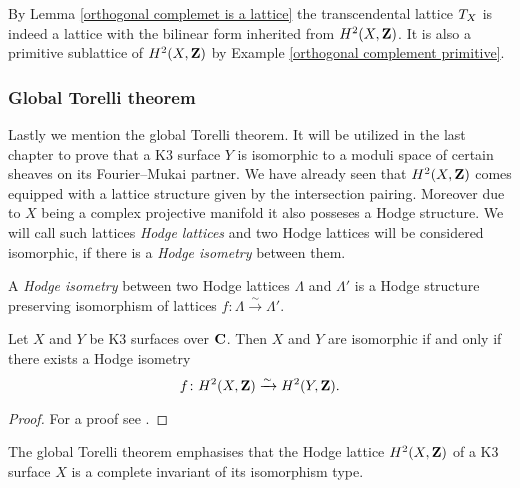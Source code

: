 \begin{remark}
    By Lemma \ref{orthogonal complemet is a lattice} the transcendental lattice $T_{X}$ is indeed a lattice with the bilinear form inherited from $H^{2}(X, \mathbf Z)$. It is also a primitive sublattice of $H^{2}(X, \mathbf Z)$ by Example \ref{orthogonal complement primitive}.
\end{remark}

\subsubsection*{Global Torelli theorem}

Lastly we mention the global Torelli theorem. It will be utilized in the last chapter to prove that a K3 surface $Y$ is isomorphic to a moduli space of certain sheaves on its Fourier--Mukai partner. We have already seen that $H^{2}(X, \mathbf Z)$ comes equipped with a lattice structure given by the intersection pairing. Moreover due to $X$ being a complex projective manifold it also posseses a Hodge structure. We will call such lattices \emph{Hodge lattices} and two Hodge lattices will be considered isomorphic, if there is a \emph{Hodge isometry} between them. 

\begin{definition}

    A \emph{Hodge isometry} between two Hodge lattices $\Lambda$ and $\Lambda'$ is a Hodge structure preserving isomorphism of lattices $f \colon \Lambda \xrightarrow{\sim} \Lambda'$.
\end{definition}

\begin{theorem}
    \label{Classical Torelli theorem}
    Let $X$ and $Y$ be K3 surfaces over $\mathbf C$. Then $X$ and $Y$ are isomorphic if and only if there exists a Hodge isometry
    \[
        f\colon H^{2}(X, \mathbf Z) \xrightarrow{\sim} H^{2}(Y, \mathbf Z).
    \]
\end{theorem}

\begin{proof}
    For a proof see \cite[\S 7, Theorem 5.3]{Huybrechts2016}.
\end{proof}

\begin{remark}
    The global Torelli theorem emphasises that the Hodge lattice $H^{2}(X, \mathbf Z)$ of a K3 surface $X$ is a complete invariant of its isomorphism type. 
\end{remark}

